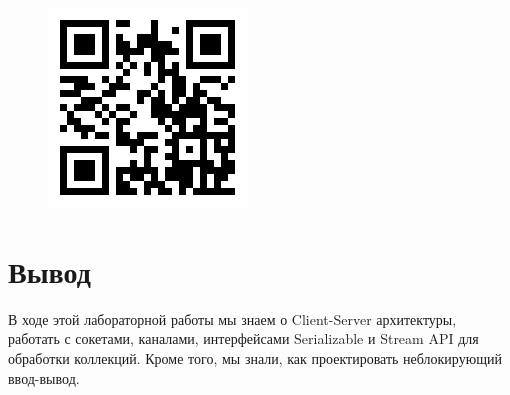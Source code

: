 \begin{figure}[H]
\includegraphics[scale=0.8]{img/QRDiagram}
\label{pic:QRDiagram}
\end{figure}

\section{Вывод}
В ходе этой лабораторной работы мы знаем о Client-Server архитектуры, работать с сокетами, каналами, интерфейсами Serializable и Stream API для обработки коллекций. Кроме того, мы знали, как проектировать неблокирующий ввод-вывод.